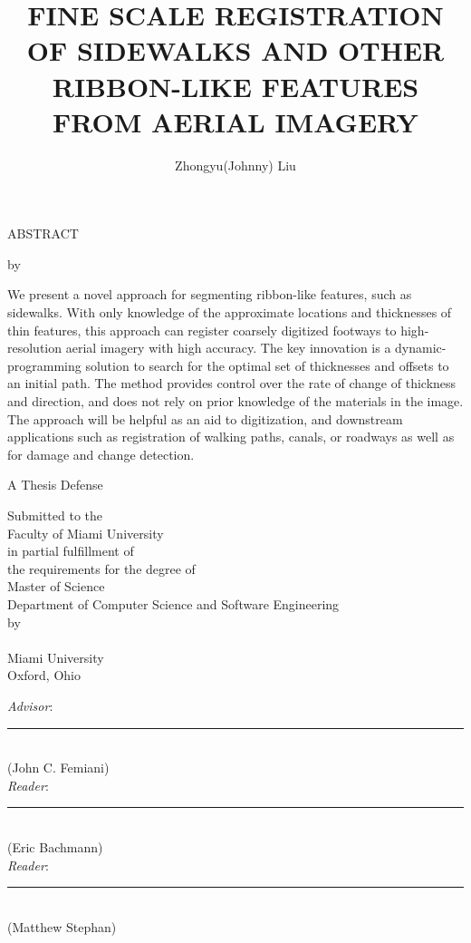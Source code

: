 \documentclass[12pt, oneside]{book2}
\title{FINE SCALE REGISTRATION OF SIDEWALKS AND OTHER RIBBON-LIKE FEATURES FROM AERIAL IMAGERY}
\author{Zhongyu(Johnny) Liu}
\def\Advisor{John C. Femiani}
\def\ReaderOne{Eric Bachmann}
\def\ReaderTwo{Matthew Stephan}
\def\Abstract{

    We present a novel approach for segmenting ribbon-like features, such as sidewalks. With only knowledge of the approximate locations and thicknesses of thin features, this approach can register coarsely digitized footways to high-resolution aerial imagery with high accuracy. The key innovation is a dynamic-programming solution to search for the optimal set of thicknesses and offsets to an initial path. The method provides control over the rate of change of thickness and direction, and does not rely on prior knowledge of the materials in the image. The approach will be helpful as an aid to digitization, and downstream applications such as registration of walking paths, canals, or roadways as well as for damage and change detection. 

}
\begin{document}
\thispagestyle{empty}
\singlespacing

\begin{center}
ABSTRACT

\vspace{2.0cm}

\makeatletter
\MakeUppercase{\@title}
\makeatother

\vspace{1.0cm}

by \makeatletter\@author\makeatother


\vspace{1.0cm}
\end{center}

\noindent \Abstract{}

\newpage

\thispagestyle{empty}

\frontmatter

\onehalfspacing

\begin{titlepage}
\begin{center}
\makeatletter
\MakeUppercase{\@title}
\makeatother

\vspace{1.5cm}

A Thesis Defense\\

\vspace{0.5cm}

Submitted to the \\
Faculty of Miami University \\
in partial fulfillment of \\
the requirements for the degree of \\
Master of Science \\
Department of Computer Science and Software Engineering \\
by \\
\makeatletter\@author\makeatother \\
Miami University \\
Oxford, Ohio \\
\the\year

\vspace{1.5cm}

\emph{Advisor}: \rule[-0.1cm]{8cm}{0.01cm} \\
(\Advisor) \\
\vspace{1.5cm}
\emph{Reader}: \rule[-0.1cm]{8cm}{0.01cm} \\
(\ReaderOne) \\
\vspace{1.5cm}
\emph{Reader}: \rule[-0.1cm]{8cm}{0.01cm} \\
(\ReaderTwo) \\
\end{center}
\end{titlepage}
\end{document}
